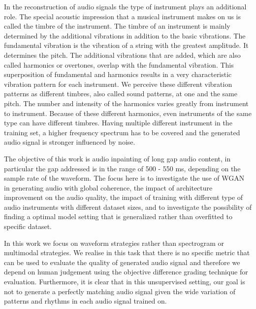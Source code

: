 \documentclass{article} %
\begin{document}
In the reconstruction of audio signals the type of instrument plays an additional role. The special acoustic impression that a musical instrument makes on us is called the timbre of the instrument. The timbre of an instrument is mainly determined by the additional vibrations in addition to the basic vibrations. The fundamental vibration is the vibration of a string with the greatest amplitude. It determines the pitch. The additional vibrations that are added, which are also called harmonics or overtones, overlap with the fundamental vibration. This superposition of fundamental and harmonics results in a very characteristic vibration pattern for each instrument. We perceive these different vibration patterns as different timbres, also called sound patterns, at one and the same pitch. The number and intensity of the harmonics varies greatly from instrument to instrument. Because of these different harmonics, even instruments of the same type can have different timbres. Having multiple different instrument in the training set, a higher frequency spectrum has to be covered and the generated audio signal is stronger influenced by noise.

The objective of this work is audio inpainting of long gap audio content, in particular the gap addressed is in the range of 500 - 550 ms, depending on the sample rate of the waveform. The focus here is to investigate the use of WGAN in generating audio with global coherence, the impact of architecture improvement on the audio quality, the impact of training with different type of audio instruments with different dataset sizes, and to investigate the possibility of finding a optimal model setting that is generalized rather than overfitted to specific dataset.

In this work we focus on waveform strategies rather than spectrogram or multimodal strategies.
We realise in this task that there is no specific metric that can be used to evaluate the quality of generated audio signal and therefore we depend on human judgement using the objective difference grading technique for evaluation. Furthermore, it is clear that in this unsupervised setting, our goal is not to generate a perfectly matching audio signal given the wide variation of patterns and rhythms in each audio signal trained on.

\end{document}
